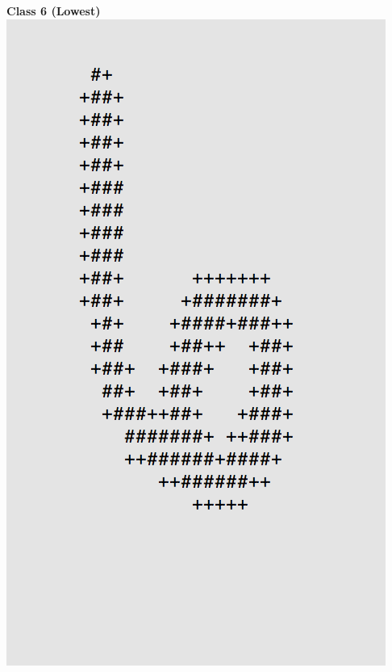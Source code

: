 \documentclass[11pt]{article}
\begin{document}
\begin{center}
\begin{multicols}{2}
\textbf{Class 6 (Lowest)}\\
\includegraphics[scale=0.4]{part1/1/low_6.png}
\end{multicols}
\end{center}
\end{document}
